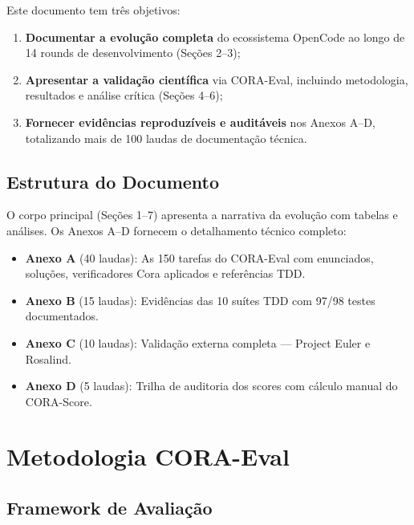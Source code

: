 \documentclass[12pt,a4paper,oneside]{article}
\begin{document}
Este documento tem três objetivos:

\begin{enumerate}[label=(\roman*)]
\item \textbf{Documentar a evolução completa} do ecossistema OpenCode ao longo
      de 14 rounds de desenvolvimento (Seções 2–3);
\item \textbf{Apresentar a validação científica} via CORA-Eval, incluindo
      metodologia, resultados e análise crítica (Seções 4–6);
\item \textbf{Fornecer evidências reproduzíveis e auditáveis} nos Anexos A–D,
      totalizando mais de 100 laudas de documentação técnica.
\end{enumerate}

\subsection{Estrutura do Documento}

O corpo principal (Seções 1–7) apresenta a narrativa da evolução com tabelas
e análises. Os Anexos A–D fornecem o detalhamento técnico completo:

\begin{itemize}
\item \textbf{Anexo A} (40 laudas): As 150 tarefas do CORA-Eval com enunciados,
      soluções, verificadores Cora aplicados e referências TDD.
\item \textbf{Anexo B} (15 laudas): Evidências das 10 suítes TDD com 97/98
      testes documentados.
\item \textbf{Anexo C} (10 laudas): Validação externa completa — Project Euler
      e Rosalind.
\item \textbf{Anexo D} (5 laudas): Trilha de auditoria dos scores com cálculo
      manual do CORA-Score.
\end{itemize}

\section{Metodologia CORA-Eval}

\subsection{Framework de Avaliação}
\end{document}
